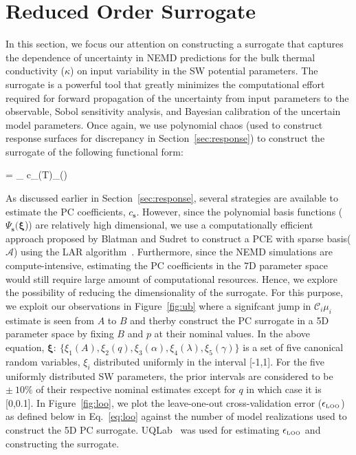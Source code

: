 \section{Reduced Order Surrogate}
\label{sec:ros}

In this section, we focus our attention on constructing a surrogate that captures the dependence of
uncertainty in NEMD predictions for the bulk thermal conductivity ($\kappa$) on input variability
in the SW potential parameters. The surrogate is a powerful tool that greatly minimizes
the computational
effort required for forward propagation of the uncertainty from input parameters to the observable,
Sobol sensitivity analysis, and Bayesian calibration of the uncertain model parameters. Once again,
we use polynomial chaos (used to construct response surfaces for discrepancy in
Section~\ref{sec:response}) to construct the surrogate of the following functional form:

\be
\kappa  = \sum\limits_{\in{}} c_{}(T)\Psi_{}(\bm{\xi})
\ee

As discussed earlier in Section~\ref{sec:response}, several strategies are available to
estimate the PC coefficients, $c_{\bm{s}}$. However, since the polynomial basis functions
($\Psi_{\bm{s}}(\bm{\xi}$)) are
relatively high dimensional, we use a computationally efficient approach proposed by
Blatman and Sudret to construct a PCE with sparse basis($\mathcal{A}$) using the LAR
algorithm~\cite{Blatman:2011}. Furthermore, since the NEMD simulations are compute-intensive,
estimating the PC coefficients in the 7D parameter space would still require large amount of
computational resources. Hence, we explore the possibility of reducing the dimensionality of
the surrogate. For this purpose, we 
exploit our observations in Figure~\ref{fig:ub} where a signifcant
jump in $\hat{\mathcal{C}_i\mu_i}$ estimate is seen from $A$ to $B$ and therby construct the 
PC surrogate in a 5D parameter space by fixing $B$ and $p$ at their nominal values. In the above
equation, $\bm{\xi}:~\{\xi_1(A),\xi_2(q),\xi_3(\alpha),\xi_4(\lambda),\xi_5(\gamma)\}$ is a set
of five canonical random variables, $\xi_i$ distributed uniformly in the interval [-1,1]. 
For the five uniformly distributed SW parameters, the prior intervals are considered to be
$\pm~10\%$ of their respective nominal estimates except for $q$ in which case it is [0,0.1]. In
Figure~\ref{fig:loo}, we plot the leave-one-out cross-validation error 
($\epsilon_{\tiny{\mbox{LOO}}}$)~\cite{Blatman:2010} as defined
below in Eq.~\ref{eq:loo} against the number of model realizations used to construct the 5D
PC surrogate. UQLab~\cite{Marelli:2014} was used for estimating $\epsilon_{\tiny{\mbox{LOO}}}$ and constructing
the surrogate. 

